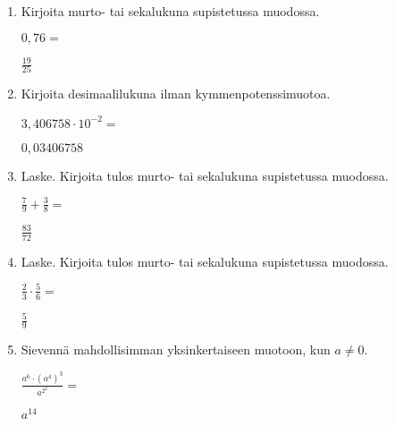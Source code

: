 \documentclass[finnish, a4paper, 12pt]{article}
\begin{document}
	\begin{enumerate}[leftmargin=*]
		\setlength\itemsep{1em}
		
		\item %
		Kirjoita murto- tai sekalukuna supistetussa muodossa. 
		
		\(
		0{,}76 = 
		\) %
		
		\begin{version:withAnswers}
		\( \frac{19}{25} \)
		\end{version:withAnswers}

		\vspace{8pt}
		
		\item %
		Kirjoita desimaalilukuna ilman kymmenpotenssimuotoa. 
		
		\(
		3{,}406758\cdot 10^{-2} = 
		\) %
		\begin{version:withAnswers}
		\( 0,03406758 \)
		\end{version:withAnswers}	
		\vspace{8pt}
		
		\item %
		Laske. Kirjoita tulos murto- tai sekalukuna supistetussa muodossa.
		
		\(
		\displaystyle
		\frac{7}{9}+\frac{3}{8} = 
		\) %
		\begin{version:withAnswers}
		\( \frac{83}{72} \)
		\end{version:withAnswers}	
		
		\vspace{8pt}
		
		\item %
		Laske. Kirjoita tulos murto- tai sekalukuna supistetussa muodossa.
		
		\(
		\displaystyle
		\frac{2}{3}\cdot\frac{5}{6} = 
		\) %
		\begin{version:withAnswers}
		\( \frac{5}{9} \)
		\end{version:withAnswers}
		
		\vspace{8pt}
		
		\item %
		Sievennä mahdollisimman yksinkertaiseen muotoon, kun \(a \not = 0\). 
		
		\(
		\displaystyle
		\frac{a^6 \cdot \left(a^4\right)^3}{a^{2^2}} =
		\phantom{mmmmmmmmmmmmmmm}
		\) %
		\begin{version:withAnswers}
		\(  a^{14} \)
		\end{version:withAnswers}
		

\end{enumerate}
\end{document}
